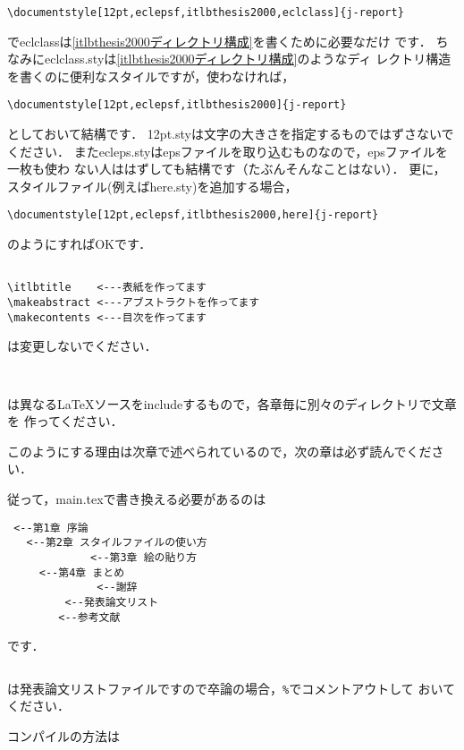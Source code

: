 \begin{verbatim}
\documentstyle[12pt,eclepsf,itlbthesis2000,eclclass]{j-report}
\end{verbatim}
でeclclassは\ref{itlbthesis2000ディレクトリ構成}を書くために必要なだけ
です．
ちなみにeclclass.styは\ref{itlbthesis2000ディレクトリ構成}のようなディ
レクトリ構造を書くのに便利なスタイルですが，使わなければ，
\begin{verbatim}
\documentstyle[12pt,eclepsf,itlbthesis2000]{j-report}
\end{verbatim}
としておいて結構です．
12pt.styは文字の大きさを指定するものではずさないでください．
またecleps.styはepsファイルを取り込むものなので，epsファイルを一枚も使わ
ない人ははずしても結構です（たぶんそんなことはない）．
更に，スタイルファイル(例えばhere.sty)を追加する場合，
\begin{verbatim}
\documentstyle[12pt,eclepsf,itlbthesis2000,here]{j-report}
\end{verbatim}
のようにすればOKです．

\begin{verbatim}

\itlbtitle    <---表紙を作ってます
\makeabstract <---アブストラクトを作ってます
\makecontents <---目次を作ってます
\end{verbatim}
は変更しないでください．

\begin{verbatim}
	
\end{verbatim}
は異なるLaTeXソースをincludeするもので，各章毎に別々のディレクトリで文章を
作ってください．

このようにする理由は次章で述べられているので，次の章は必ず読んでください．

従って，main.texで書き換える必要があるのは
\begin{verbatim}
 <--第1章 序論
   <--第2章 スタイルファイルの使い方
             <--第3章 絵の貼り方
     <--第4章 まとめ
              <--謝辞
         <--発表論文リスト
        <--参考文献
\end{verbatim}
です．
\begin{verbatim}

\end{verbatim}
は発表論文リストファイルですので卒論の場合，\verb|%|でコメントアウトして
 おいてください．

コンパイルの方法は

